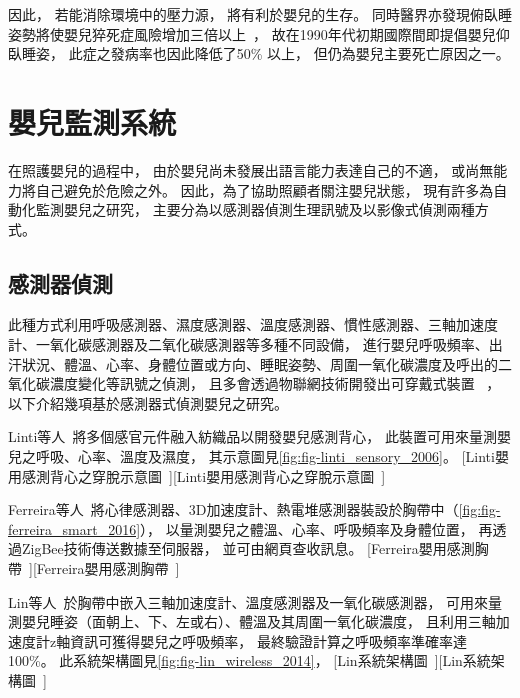\documentclass[class=NCU_thesis, crop=false]{standalone}
\begin{document}
因此，
若能消除環境中的壓力源，
將有利於嬰兒的生存。
同時醫界亦發現俯臥睡姿勢將使嬰兒猝死症風險增加三倍以上~\cite{willinger_infant_1994}，
故在1990年代初期國際間即提倡嬰兒仰臥睡姿，
此症之發病率也因此降低了50\% 以上，
但仍為嬰兒主要死亡原因之一。

\section{嬰兒監測系統}
在照護嬰兒的過程中，
由於嬰兒尚未發展出語言能力表達自己的不適，
或尚無能力將自己避免於危險之外。
因此，為了協助照顧者關注嬰兒狀態，
現有許多為自動化監測嬰兒之研究，
主要分為以感測器偵測生理訊號及以影像式偵測兩種方式。

\subsection{感測器偵測}
此種方式利用呼吸感測器、濕度感測器、溫度感測器、慣性感測器、三軸加速度計、一氧化碳感測器及二氧化碳感測器等多種不同設備，
進行嬰兒呼吸頻率、出汗狀況、體溫、心率、身體位置或方向、睡眠姿勢、周圍一氧化碳濃度及呼出的二氧化碳濃度變化等訊號之偵測，
且多會透過物聯網技術開發出可穿戴式裝置
~\cite{klingeberg_mobile_2012, zhou_low_2015, bouwstra_smart_2009, malhi_zigbee-based_2012, gonzalez-valenzuela_mobility_2011, 
darwish_wearable_2011, ko_wireless_2010, linti_sensory_2006, ferreira_smart_2016, lin_wireless_2014}，
以下介紹幾項基於感測器式偵測嬰兒之研究。

Linti等人~\cite{linti_sensory_2006}將多個感官元件融入紡織品以開發嬰兒感測背心，
此裝置可用來量測嬰兒之呼吸、心率、溫度及濕度，
其示意圖見\cref{fig:fig-linti_sensory_2006}。
[Linti嬰用感測背心之穿脫示意圖~\cite{linti_sensory_2006}][Linti嬰用感測背心之穿脫示意圖~\cite{linti_sensory_2006}]

Ferreira等人~\cite{ferreira_smart_2016}將心律感測器、3D加速度計、熱電堆感測器裝設於胸帶中（\cref{fig:fig-ferreira_smart_2016}），
以量測嬰兒之體溫、心率、呼吸頻率及身體位置，
再透過ZigBee技術傳送數據至伺服器，
並可由網頁查收訊息。
[Ferreira嬰用感測胸帶~\cite{ferreira_smart_2016}][Ferreira嬰用感測胸帶~\cite{ferreira_smart_2016}]

Lin等人~\cite{lin_wireless_2014}於胸帶中嵌入三軸加速度計、溫度感測器及一氧化碳感測器，
可用來量測嬰兒睡姿（面朝上、下、左或右）、體溫及其周圍一氧化碳濃度，
且利用三軸加速度計z軸資訊可獲得嬰兒之呼吸頻率，
最終驗證計算之呼吸頻率準確率達100\%。
此系統架構圖見\cref{fig:fig-lin_wireless_2014}，
[Lin系統架構圖~\cite{lin_wireless_2014}][Lin系統架構圖~\cite{lin_wireless_2014}]
\end{document}

